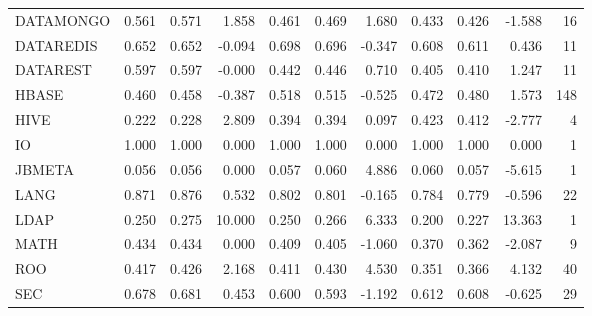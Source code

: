 \begin{tabular}{lrrrrrrrrrr}
DATAMONGO     & 0.561 &     0.571 &                1.858 &     0.461 &         0.469 &                    1.680 &       0.433 &           0.426 &                     -1.588 &     16 \\
DATAREDIS     & 0.652 &     0.652 &               -0.094 &     0.698 &         0.696 &                   -0.347 &       0.608 &           0.611 &                      0.436 &     11 \\
DATAREST      & 0.597 &     0.597 &               -0.000 &     0.442 &         0.446 &                    0.710 &       0.405 &           0.410 &                      1.247 &     11 \\
HBASE         & 0.460 &     0.458 &               -0.387 &     0.518 &         0.515 &                   -0.525 &       0.472 &           0.480 &                      1.573 &    148 \\
HIVE          & 0.222 &     0.228 &                2.809 &     0.394 &         0.394 &                    0.097 &       0.423 &           0.412 &                     -2.777 &      4 \\
IO            & 1.000 &     1.000 &                0.000 &     1.000 &         1.000 &                    0.000 &       1.000 &           1.000 &                      0.000 &      1 \\
JBMETA        & 0.056 &     0.056 &                0.000 &     0.057 &         0.060 &                    4.886 &       0.060 &           0.057 &                     -5.615 &      1 \\
LANG          & 0.871 &     0.876 &                0.532 &     0.802 &         0.801 &                   -0.165 &       0.784 &           0.779 &                     -0.596 &     22 \\
LDAP          & 0.250 &     0.275 &               10.000 &     0.250 &         0.266 &                    6.333 &       0.200 &           0.227 &                     13.363 &      1 \\
MATH          & 0.434 &     0.434 &                0.000 &     0.409 &         0.405 &                   -1.060 &       0.370 &           0.362 &                     -2.087 &      9 \\
ROO           & 0.417 &     0.426 &                2.168 &     0.411 &         0.430 &                    4.530 &       0.351 &           0.366 &                      4.132 &     40 \\
SEC           & 0.678 &     0.681 &                0.453 &     0.600 &         0.593 &                   -1.192 &       0.612 &           0.608 &                     -0.625 &     29 \\

\end{tabular}
